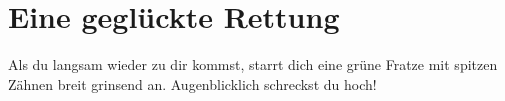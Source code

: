 \chapter*{Eine geglückte Rettung}


Als du langsam wieder zu dir kommst, starrt dich eine grüne Fratze mit spitzen Zähnen breit grinsend an. %
Augenblicklich schreckst du hoch!
